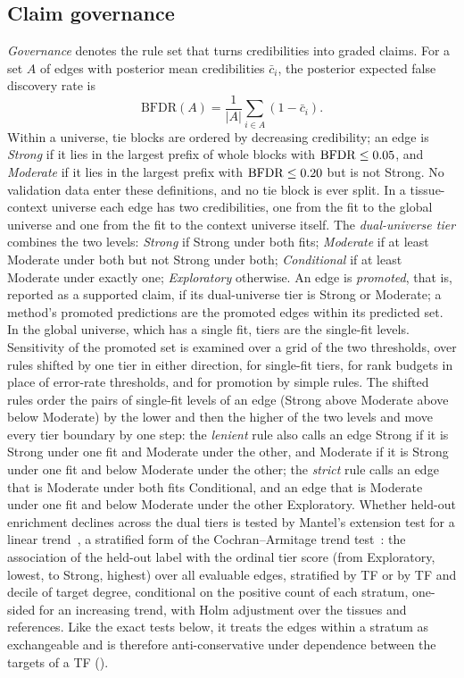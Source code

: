 \subsection{Claim governance}\label{sec:governance}
\emph{Governance} denotes the rule set that turns credibilities into graded claims.
For a set $A$ of edges with posterior mean credibilities $\bar c_i$, the posterior expected false discovery rate is~\citep{newton2004detecting}
\begin{equation}
  \mathrm{BFDR}(A)=\frac{1}{|A|}\sum_{i\in A}(1-\bar c_i).
  \label{eq:bfdr}
\end{equation}
Within a universe, tie blocks are ordered by decreasing credibility; an edge is \emph{Strong} if it lies in the largest prefix of whole blocks with $\mathrm{BFDR}\le 0.05{}$, and \emph{Moderate} if it lies in the largest prefix with $\mathrm{BFDR}\le 0.20{}$ but is not Strong.
No validation data enter these definitions, and no tie block is ever split.
In a tissue-context universe each edge has two credibilities, one from the fit to the global universe and one from the fit to the context universe itself. The \emph{dual-universe tier} combines the two levels: \emph{Strong} if Strong under both fits; \emph{Moderate} if at least Moderate under both but not Strong under both; \emph{Conditional} if at least Moderate under exactly one; \emph{Exploratory} otherwise.
An edge is \emph{promoted}, that is, reported as a supported claim, if its dual-universe tier is Strong or Moderate; a method's promoted predictions are the promoted edges within its predicted set.
In the global universe, which has a single fit, tiers are the single-fit levels.
Sensitivity of the promoted set is examined over a grid of the two thresholds, over rules shifted by one tier in either direction, for single-fit tiers, for rank budgets in place of error-rate thresholds, and for promotion by simple rules.
The shifted rules order the pairs of single-fit levels of an edge (Strong above Moderate above below Moderate) by the lower and then the higher of the two levels and move every tier boundary by one step: the \emph{lenient} rule also calls an edge Strong if it is Strong under one fit and Moderate under the other, and Moderate if it is Strong under one fit and below Moderate under the other; the \emph{strict} rule calls an edge that is Moderate under both fits Conditional, and an edge that is Moderate under one fit and below Moderate under the other Exploratory.
Whether held-out enrichment declines across the dual tiers is tested by Mantel's extension test for a linear trend~\citep{mantel1963chisquare}, a stratified form of the Cochran--Armitage trend test~\citep{cochran1954some,armitage1955tests}: the association of the held-out label with the ordinal tier score (from Exploratory, lowest, to Strong, highest) over all evaluable edges, stratified by TF or by TF and decile of target degree, conditional on the positive count of each stratum, one-sided for an increasing trend, with Holm adjustment over the tissues and references. Like the exact tests below, it treats the edges within a stratum as exchangeable and is therefore anti-conservative under dependence between the targets of a TF ().
